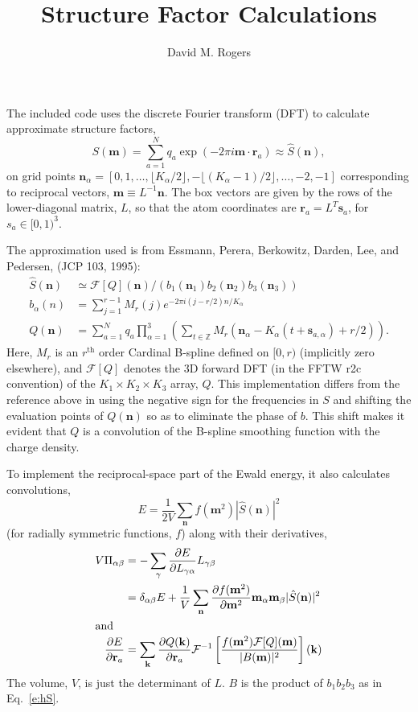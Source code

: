 \documentclass{amsart}
\title{ Structure Factor Calculations}
\author{ David M. Rogers}
\renewcommand{\vec}[1]{\mathbf{#1}}
\begin{document}
  The included code uses the discrete Fourier transform (DFT)
to calculate approximate structure factors,
\begin{equation}
S(\vec m) = \sum_{a=1}^N q_a \exp(-2\pi i \vec m\cdot \vec r_a)
  \approx \hat S(\vec n),
\end{equation}
on grid points $\vec n_\alpha = [0, 1, \ldots, \lfloor K_\alpha/2 \rfloor, -\lfloor (K_\alpha-1)/2 \rfloor, \ldots, -2, -1]$
corresponding to reciprocal vectors, $\vec m \equiv L^{-1} \vec n$.
The box vectors are given by the rows of the lower-diagonal matrix,
$L$, so that the atom coordinates are $\vec r_a = L^T \vec s_a$,
for $s_a \in [0,1)^3$.

  The approximation used is from Essmann, Perera, Berkowitz,
Darden, Lee, and Pedersen, (JCP 103, 1995):
\begin{align}
    \hat S(\vec n) &\simeq \mathcal F[Q](\vec n)
                    / (b_1(\vec n_1) b_2(\vec n_2) b_3(\vec n_3)) \label{e:hS} \\
b_\alpha(n) &= \sum_{j=1}^{r-1} M_r(j) e^{-2\pi i (j-r/2) n/K_\alpha} \\
Q(\vec n) &= \sum_{a=1}^N q_a \prod_{\alpha=1}^3 \left(
    \sum_{t\in\mathbb Z} M_r(\vec n_\alpha - K_\alpha (t+\vec s_{a,\alpha}) + r/2) \right)
.
\end{align}
Here, $M_r$ is an $r^\text{th}$ order Cardinal B-spline defined on $[0,r)$
(implicitly zero elsewhere),
and $\mathcal F[Q]$ denotes the 3D forward DFT (in the FFTW r2c convention)
of the $K_1 \times K_2 \times K_3$ array, $Q$.
This implementation differs from the reference above in using the negative
sign for the frequencies in $S$ and shifting the evaluation points
of $Q(\vec n)$ so as to eliminate the phase of $b$.  This
shift makes it evident that $Q$ is a convolution of the B-spline
smoothing function with the charge density.

  To implement the reciprocal-space part of the Ewald energy, it also
calculates convolutions,
\begin{equation}
E = \frac{1}{2 V} \sum_{\vec n} f(\vec m^2) |\hat S(\vec n)|^2
\end{equation}
(for radially symmetric functions, $f$)
along with their derivatives,
\begin{align}
V \Pi_{\alpha\beta} &= -\sum_\gamma \frac{\partial E}{\partial L_{\gamma\alpha}}
            L_{\gamma\beta} \\
  &= \delta_{\alpha\beta} E
        + \frac{1}{V} \sum_{\vec n}
                            \frac{\partial f(\vec m^2)}{\partial \vec m^2}
            \vec m_\alpha \vec m_\beta |\hat S(\vec n)|^2 \\
\intertext{and}
\frac{\partial E}{\partial \vec r_a} &= \sum_{\vec k}
  \frac{\partial Q(\vec k)}{\partial \vec r_a}
                    \mathcal F^{-1}\left[
                        \frac{f(\vec m^2) \mathcal F[Q](\vec m)}{|B(\vec m)|^2}
                    \right](\vec k)
\end{align}
The volume, $V$, is just the determinant of $L$.
$B$ is the product of $b_1 b_2 b_3$ as in Eq.~\ref{e:hS}.
\end{document}
